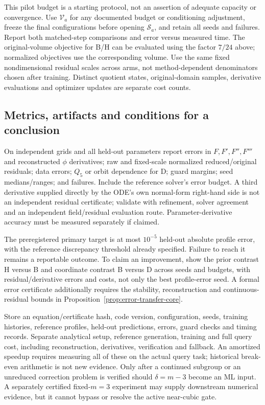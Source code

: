 This pilot budget is a starting protocol, not an assertion of adequate
capacity or convergence. Use $\mathcal V_a$ for any documented budget or
conditioning adjustment, freeze the final configurations before opening
$\mathcal S_a$, and retain all seeds and failures. Report both matched-step
comparisons and error versus measured time. The original-volume objective
for B/H can be evaluated using the factor $7/24$ above; normalized objectives
use the corresponding volume. Use the same fixed nondimensional residual
scales across arms, not method-dependent denominators chosen after training.
Distinct quotient states, original-domain samples, derivative evaluations
and optimizer updates are separate cost counts.

\subsection{Metrics, artifacts and conditions for a conclusion}
On independent grids and all held-out parameters report errors in
$F,F',F'',F'''$ and reconstructed $\phi$ derivatives; raw and fixed-scale
normalized reduced/original residuals; data errors; $Q_5$ or orbit dependence
for D; guard margins; seed medians/ranges; and failures. Include the reference
solver's error budget. A third derivative supplied directly by the ODE's
own normal-form right-hand side is not an independent residual certificate;
validate with refinement, solver agreement and an independent field/residual
evaluation route. Parameter-derivative accuracy must be measured separately
if claimed.

The preregistered primary target is at most $10^{-5}$ held-out absolute
profile error, with the reference discrepancy threshold already specified.
Failure to reach it remains a reportable outcome. To claim an improvement,
show the prior contrast H versus B and coordinate contrast B versus D
across seeds and budgets, with residual/derivative errors and costs, not
only the best profile-error seed. A formal error certificate additionally
requires the stability, reconstruction and continuous-residual bounds in
Proposition~\ref{prop:error-transfer-core}.

Store an equation/certificate hash, code version, configuration, seeds,
training histories, reference profiles, held-out predictions, errors,
guard checks and timing records. Separate analytical setup, reference
generation, training and full query cost, including reconstruction,
derivatives, verification and fallback. An amortized speedup requires
measuring all of these on the actual query task; historical break-even
arithmetic is not new evidence. Only after a continued subgroup or an
unreduced correction problem is verified should $\delta=m-3$ become an ML
input. A separately certified fixed-$m=3$ experiment may supply downstream
numerical evidence, but it cannot bypass or resolve the active near-cubic gate.


